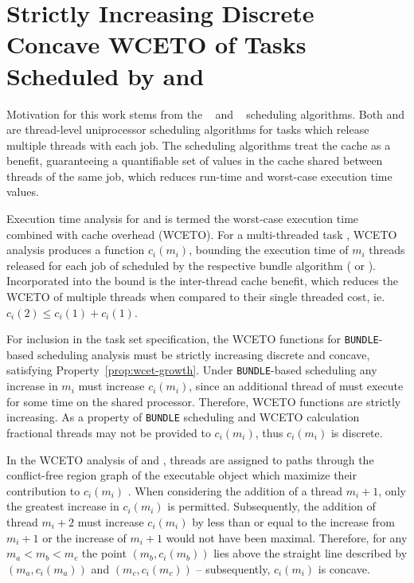 \renewcommand{\tex}[1]{40-growth-bundle/#1}

\section{Strictly Increasing Discrete Concave WCETO of Tasks Scheduled
  by \bundle{} and \bundlep{}}
\label{sec:bundle-growth}

Motivation for this work stems from the \bundle{}~\cite{Tessler:2016}
and \bundlep{}~\cite{Tessler:2018} scheduling algorithms. Both
\bundle{} and \bundlep{} are thread-level uniprocessor scheduling
algorithms for tasks which release multiple threads with each job. The
scheduling algorithms treat the cache as a benefit, guaranteeing a
quantifiable set of values in the cache shared between threads of the
same job, which reduces run-time and worst-case execution time values. 

Execution time analysis for \bundle{} and \bundlep{} is termed the
worst-case execution time combined with cache overhead
(WCETO). For a multi-threaded task , WCETO analysis produces
a function ${c_i(m_i)}$, bounding the execution time of ${m_i}$
threads released for each job of  scheduled by the respective
bundle algorithm (\bundle{} or \bundlep{}). Incorporated into the
bound is the inter-thread cache benefit, which reduces the WCETO of
multiple threads when compared to their single threaded cost,
ie. ${c_i(2) \le c_i(1) + c_i(1)}$.

For inclusion in the task set specification, the WCETO 
functions for \texttt{BUNDLE}-based scheduling analysis must be
strictly increasing discrete and concave, satisfying
Property~\ref{prop:wcet-growth}. Under \texttt{BUNDLE}-based
scheduling any increase in ${m_i}$ must increase 
${c_i(m_i)}$, since an additional thread of  must execute for
some time on the shared processor. Therefore, WCETO functions are
strictly increasing. As a property of \texttt{BUNDLE} scheduling and
WCETO calculation fractional threads may not be provided to
${c_i(m_i)}$, thus ${c_i(m_i)}$ is discrete.

In the WCETO analysis of \bundle{} and \bundlep{}, threads are
assigned to paths through the conflict-free region graph of the
executable object which maximize their contribution to
${c_i(m_i)}$ . When considering the addition of a thread ${m_i + 1}$,
only the greatest increase in ${c_i(m_i)}$ is permitted. Subsequently,
the addition of thread ${m_i + 2}$ must increase ${c_i(m_i)}$ by less
than or equal to the increase from ${m_i + 1}$ or the increase of
${m_i + 1}$ would not have been maximal. Therefore, for any ${m_a <
  m_b < m_c}$ the point ${(m_b, c_i(m_b))}$ lies above the straight line
described by ${(m_a, c_i(m_a))}$ and ${(m_c, c_i(m_c))}$ --
subsequently, ${c_i(m_i)}$ is concave.

